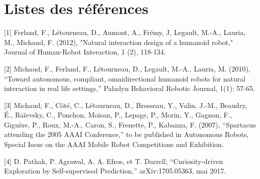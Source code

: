 \documentclass[letterpaper, 12pt]{article}
\begin{document}
    \pagebreak
    \section{Listes des références}
    [1]     Ferland, F., Létourneau, D., Aumont, A., Frémy, J, Legault, M.-A., Lauria, M., Michaud,         F. (2012), "Natural interaction design of a humanoid robot," Journal of Human-Robot         Interaction, 1 (2), 118-134.
    \bigskip
    
    [2]    Michaud, F., Ferland, F., Létourneau, D., Legault, M.-A., Lauria, M. (2010), “Toward         autonomous, compliant, omnidirectional humanoid robots for natural interaction in real         life settings,” Paladyn Behavioral Robotic Journal, 1(1): 57-65.
    \bigskip
    
    [3]    Michaud, F., Côté, C., Létourneau, D., Brosseau, Y., Valin, J.-M., Beaudry, É.,             Raïevsky, C., Ponchon, Moisan, P., Lepage, P., Morin, Y., Gagnon, F., Giguère, P.,             Roux, M.-A., Caron, S., Frenette, P., Kabanza, F. (2007), “Spartacus attending the             2005 AAAI Conference,” to be published in Autonomous Robots, Special Issue on the         AAAI Mobile Robot Competitions and Exhibition.
    \bigskip
    
    [4]    D. Pathak, P. Agrawal, A. A. Efros, et T. Darrell, “Curiosity-driven Exploration by             Self-supervised Prediction,” arXiv:1705.05363, mai 2017.
    \bigskip
    
        
    \pagebreak
    
    \singlespacing
    \renewcommand{\refname}{Bibliographie}
    
    
\end{document}
